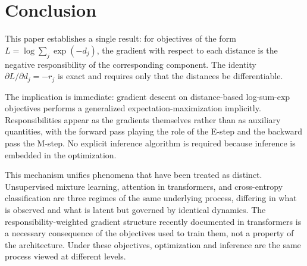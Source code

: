 \section{Conclusion}

This paper establishes a single result: for objectives of the form $L = \log \sum_j \exp(-d_j)$, the gradient with respect to each distance is the negative responsibility of the corresponding component. The identity $\partial L / \partial d_j = -r_j$ is exact and requires only that the distances be differentiable.

The implication is immediate: gradient descent on distance-based log-sum-exp objectives performs a generalized expectation-maximization implicitly. Responsibilities appear as the gradients themselves rather than as auxiliary quantities, with the forward pass playing the role of the E-step and the backward pass the M-step. No explicit inference algorithm is required because inference is embedded in the optimization.

This mechanism unifies phenomena that have been treated as distinct. Unsupervised mixture learning, attention in transformers, and cross-entropy classification are three regimes of the same underlying process, differing in what is observed and what is latent but governed by identical dynamics. The responsibility-weighted gradient structure recently documented in transformers is a necessary consequence of the objectives used to train them, not a property of the architecture. Under these objectives, optimization and inference are the same process viewed at different levels.
